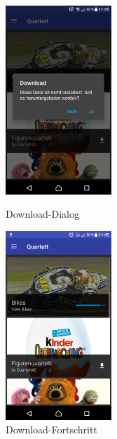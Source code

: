 \documentclass{scrartcl}
\begin{document}
\begin{figure}[!ht]
  \centering
  \begin{minipage}{0.45\textwidth}
    \centering
    \includegraphics[width=4cm]{img/gallery_dialog.png}
    \caption{Download-Dialog}
  \end{minipage}
  \hfill
  \begin{minipage}{0.45\textwidth}
    \centering
    \includegraphics[width=4cm]{img/gallery_download.png}
    \caption{Download-Fortschritt}
  \end{minipage}
\end{figure}
\end{document}
